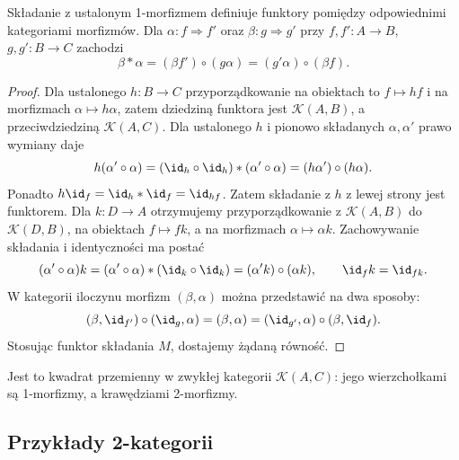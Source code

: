 \begin{stwierdzenie}\label{cat:prop:two-whiskering}
Składanie z ustalonym 1-morfizmem definiuje funktory pomiędzy odpowiednimi kategoriami morfizmów. Dla $\alpha:f\Rightarrow f'$ oraz $\beta:g\Rightarrow g'$ przy $f,f':A\to B$, $g,g':B\to C$ zachodzi
\[
 \beta\ast\alpha=(\beta f')\circ(g\alpha)
 =(g'\alpha)\circ(\beta f).
\]
\end{stwierdzenie}
\begin{proof}
Dla ustalonego $h:B\to C$ przyporządkowanie na obiektach to $f\mapsto hf$ i na morfizmach $\alpha\mapsto h\alpha$, zatem dziedziną funktora jest $\mathcal K(A,B)$, a przeciwdziedziną $\mathcal K(A,C)$. Dla ustalonego $h$ i pionowo składanych $\alpha,\alpha'$ prawo wymiany daje
\[
 h(\alpha'\circ\alpha)
 =(\id_h\circ\id_h)\ast(\alpha'\circ\alpha)
 =(h\alpha')\circ(h\alpha).
\]
Ponadto $h\id_f=\id_h\ast\id_f=\id_{hf}$. Zatem składanie z $h$ z lewej strony jest funktorem. Dla $k:D\to A$ otrzymujemy przyporządkowanie z $\mathcal K(A,B)$ do $\mathcal K(D,B)$, na obiektach $f\mapsto fk$, a na morfizmach $\alpha\mapsto\alpha k$. Zachowywanie składania i identyczności ma postać
\[
 (\alpha'\circ\alpha)k
 =(\alpha'\circ\alpha)\ast(\id_k\circ\id_k)
 =(\alpha' k)\circ(\alpha k),\qquad
 \id_f k=\id_{fk}.
\]
W kategorii iloczynu morfizm $(\beta,\alpha)$ można przedstawić na dwa sposoby:
\[
 (\beta,\id_{f'})\circ(\id_g,\alpha)
 =(\beta,\alpha)
 =(\id_{g'},\alpha)\circ(\beta,\id_f).
\]
Stosując funktor składania $M$, dostajemy żądaną równość.
\end{proof}

\begin{center}
\end{center}
Jest to kwadrat przemienny w zwykłej kategorii $\mathcal K(A,C)$: jego wierzchołkami są 1-morfizmy, a krawędziami 2-morfizmy.

\subsection{Przykłady 2-kategorii}

